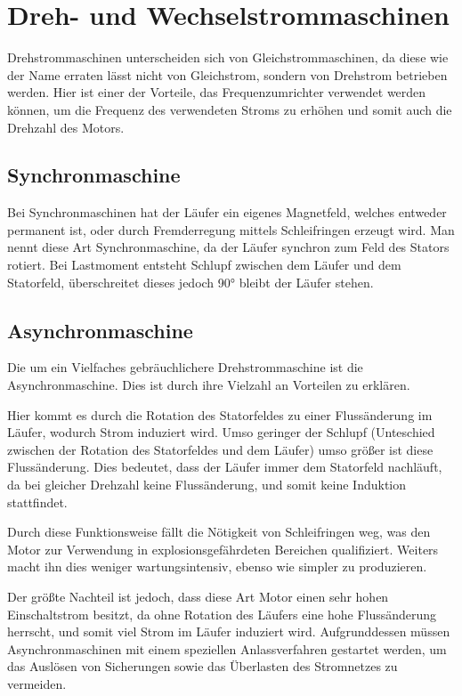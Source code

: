 \chapter{Dreh- und Wechselstrommaschinen}

Drehstrommaschinen unterscheiden sich von Gleichstrommaschinen, da diese wie der Name erraten lässt nicht von Gleichstrom, sondern von Drehstrom betrieben werden.
Hier ist einer der Vorteile, das Frequenzumrichter verwendet werden können, um die Frequenz des verwendeten Stroms zu erhöhen und somit auch die Drehzahl des Motors.

\section{Synchronmaschine}

Bei Synchronmaschinen hat der Läufer ein eigenes Magnetfeld, welches entweder permanent ist, oder durch Fremderregung mittels Schleifringen erzeugt wird.
Man nennt diese Art Synchronmaschine, da der Läufer synchron zum Feld des Stators rotiert.
Bei Lastmoment entsteht Schlupf zwischen dem Läufer und dem Statorfeld, überschreitet dieses jedoch 90° bleibt der Läufer stehen.
\cite{sydewiki:204475526}

\section{Asynchronmaschine}

Die um ein Vielfaches gebräuchlichere Drehstrommaschine ist die Asynchronmaschine.
Dies ist durch ihre Vielzahl an Vorteilen zu erklären.

Hier kommt es durch die Rotation des Statorfeldes zu einer Flussänderung im Läufer, wodurch Strom induziert wird.
Umso geringer der Schlupf (Unteschied zwischen der Rotation des Statorfeldes und dem Läufer) umso größer ist diese Flussänderung.
Dies bedeutet, dass der Läufer immer dem Statorfeld nachläuft, da bei gleicher Drehzahl keine Flussänderung, und somit keine Induktion stattfindet.

Durch diese Funktionsweise fällt die Nötigkeit von Schleifringen weg, was den Motor zur Verwendung in explosionsgefährdeten Bereichen qualifiziert.
Weiters macht ihn dies weniger wartungsintensiv, ebenso wie simpler zu produzieren.

Der größte Nachteil ist jedoch, dass diese Art Motor einen sehr hohen Einschaltstrom besitzt, da ohne Rotation des Läufers eine hohe Flussänderung herrscht, und somit viel Strom im Läufer induziert wird.
Aufgrunddessen müssen Asynchronmaschinen mit einem speziellen Anlassverfahren gestartet werden, um das Auslösen von Sicherungen sowie das Überlasten des Stromnetzes zu vermeiden.
\cite{asdewiki:206736532}